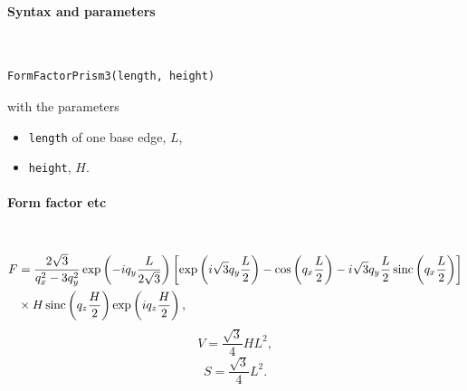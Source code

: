 \FloatBarrier

\paragraph{Syntax and parameters}\strut\\[-2ex plus .2ex minus .2ex]
\begin{lstlisting}[language=python, style=eclipseboxed,numbers=none,nolol]
  FormFactorPrism3(length, height)
\end{lstlisting}
with the parameters
\begin{itemize}
\item \texttt{length} of one base edge, $L$,
\item \texttt{height}, $H$.
\end{itemize}


\paragraph{Form factor etc}\strut\\
\begin{align*}
F &= \frac{2 \sqrt{3}}{q_x^2-3q_y^2} 
     \exp\left(-i q_y\frac{L}{2\sqrt{3}}\right)
    \left[\exp\left(i \sqrt{3} q_y \frac{L}{2} \right)-\cos\left(q_x \frac{L}{2}\right)
    -i \sqrt{3} q_y \frac{L}{2} \operatorname{sinc}\left(q_x \frac{L}{2}\right) \right] \\
  &
  \times  H \operatorname{sinc}\left(q_z \frac{H}{2} \right) \exp\left(i q_z \frac{H}{2}\right),
\end{align*}
\begin{equation*}
  V= \dfrac{\sqrt{3}}{4} H L^2,
\end{equation*}
\begin{equation*}
  S =\dfrac{\sqrt{3}}{4}L^2.
\end{equation*}

